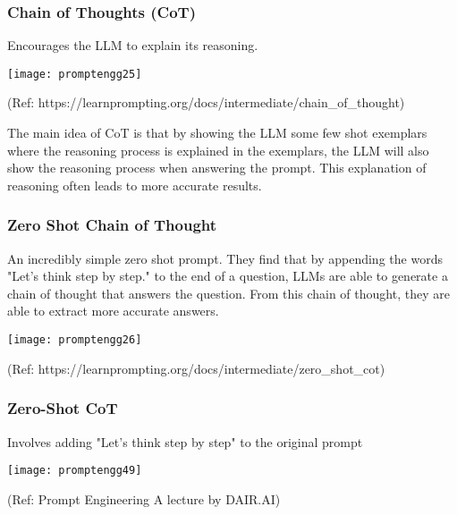 \begin{frame}[fragile]\frametitle{Chain of Thoughts (CoT)}

Encourages the LLM to explain its reasoning. 

\begin{center}
\texttt{[image: promptengg25]}

{\tiny (Ref: https://learnprompting.org/docs/intermediate/chain\_of\_thought)}

\end{center}		

The main idea of CoT is that by showing the LLM some few shot exemplars where the reasoning process is explained in the exemplars, the LLM will also show the reasoning process when answering the prompt. This explanation of reasoning often leads to more accurate results.

\end{frame}

\begin{frame}[fragile]\frametitle{Zero Shot Chain of Thought}

An incredibly simple zero shot prompt. They find that by appending the words "Let's think step by step." to the end of a question, LLMs are able to generate a chain of thought that answers the question. From this chain of thought, they are able to extract more accurate answers.

\begin{center}
\texttt{[image: promptengg26]}

{\tiny (Ref: https://learnprompting.org/docs/intermediate/zero\_shot\_cot)}

\end{center}		

\end{frame}

\begin{frame}[fragile]\frametitle{Zero-Shot CoT}

 Involves adding "Let's think step by step" to the original 
prompt


\begin{center}
\texttt{[image: promptengg49]}

{\tiny (Ref: Prompt Engineering A lecture by DAIR.AI)}

\end{center}	

\end{frame}



